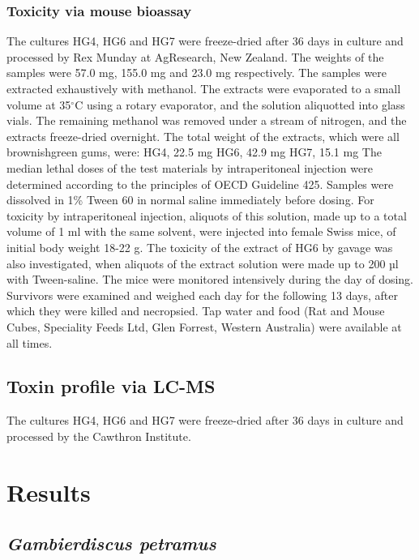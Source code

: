 \documentclass[12pt]{article}
\begin{document}
\subsubsection{Toxicity via mouse bioassay}
The cultures HG4, HG6 and HG7 were freeze-dried after 36 days in culture and processed by Rex Munday at AgResearch, New Zealand. The weights of the samples were 57.0 mg, 155.0 mg and 23.0 mg respectively. The samples were extracted exhaustively with methanol. The extracts were evaporated to a small volume at 35$^{\circ}$C using a rotary evaporator, and the solution aliquotted into glass vials. The remaining methanol was removed under a stream of nitrogen, and the extracts freeze-dried overnight. The total weight of the extracts, which were all brownishgreen gums, were: HG4, 22.5 mg HG6, 42.9 mg HG7, 15.1 mg The median lethal doses of the test materials by intraperitoneal injection were determined according to the principles of OECD Guideline 425. Samples were dissolved in 1\% Tween 60 in normal saline immediately before dosing. For toxicity by intraperitoneal injection, aliquots of this solution, made up to a total volume of 1 ml with the same solvent, were injected into female Swiss mice, of initial body weight 18-22 g. The toxicity of the extract of HG6 by gavage was also investigated, when aliquots of the extract solution were made up to 200 µl with Tween-saline. The mice were monitored intensively during the day of dosing. Survivors were examined and weighed each day for the following 13 days, after which they were killed and necropsied. Tap water and food (Rat and Mouse Cubes, Speciality Feeds Ltd, Glen Forrest, Western Australia) were available at all times.

\subsection{Toxin profile via LC-MS}
The cultures HG4, HG6 and HG7 were freeze-dried after 36 days in culture and processed by the Cawthron Institute.
\newpage
\section{Results}

\subsection{\emph{Gambierdiscus petramus}}
\end{document}
